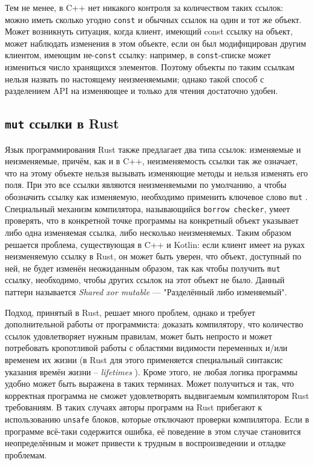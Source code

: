 \documentclass[specification,annotation,times]{itmo-student-thesis}
\begin{document}
Тем не менее, в C++ нет никакого контроля за количеством таких ссылок: можно иметь сколько угодно \texttt{const} и обычных ссылок на один и тот же объект. Может возникнуть ситуация, когда клиент, имеющий const ссылку на объект, может наблюдать изменения в этом объекте, если он был модифицирован другим клиентом, имеющим не-\texttt{const} ссылку: например, в \texttt{const}-списке может измениться число хранящихся элементов.
Поэтому объекты по таким ссылкам нельзя назвать по настоящему неизменяемыми; однако такой способ с разделением API на изменяющее и только для чтения достаточно удобен.

\subsection{\texttt{mut} ссылки в Rust}

Язык программирования Rust \cite{rust-lang} также предлагает два типа ссылок: изменяемые и неизменяемые, причём, как и в C++, неизменяемость ссылки так же означает, что на этому объекте нельзя вызывать изменяющие методы и нельзя изменять его поля. При это все ссылки являются неизменяемыми по умолчанию, а чтобы обозначить ссылку как изменяемую, необходимо применить ключевое слово \texttt{mut} \cite{rust-mut}. 
Специальный механизм компилятора, называющийся \texttt{borrow checker}, умеет проверять, что в конкретной точке программы на конкретный объект указывает либо одна изменяемая ссылка, либо несколько неизменяемых.
Таким образом решается проблема, существующая в C++ и Kotlin: если клиент имеет на руках неизменяемую ссылку в Rust, он может быть уверен, что объект, доступный по ней, не будет изменён неожиданным образом, так как чтобы получить \texttt{mut} ссылку, необходимо, чтобы других ссылок на этот объект не было.
Данный паттерн называется \textit{Shared xor mutable} --- "Разделённый либо изменяемый".

Подход, принятый в Rust, решает много проблем, однако и требует дополнительной работы от программиста: доказать компилятору, что количество ссылок удовлетворяет нужным правилам, может быть непросто и может потребовать кропотливой работы с областями видимости переменных и/или временем их жизни (в Rust для этого применяется специальный синтаксис указания времён жизни -- \textit{lifetimes} \cite{rust-lifetimes}).
Кроме этого, не любая логика программы удобно может быть выражена в таких терминах. Может получиться и так, что корректная программа не сможет удовлетворять выдвигаемым компилятором Rust требованиям.
В таких случаях авторы программ на Rust прибегают к использованию \texttt{unsafe} блоков, которые отключают проверки компилятора.
Если в программе всё-таки содержится ошибка, её поведение в этом случае становится неопределённым и может привести к трудным в воспроизведении и отладке проблемам.
\end{document}
